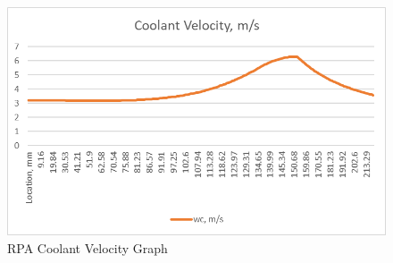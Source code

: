 \begin{figure}
    \centering
    \includegraphics[width=1\linewidth]{RPA Coolant Velocity Graph.png}
    \caption{RPA Coolant Velocity Graph}
    \label{fig:RPA Coolant Velocity Graph}
\end{figure}

